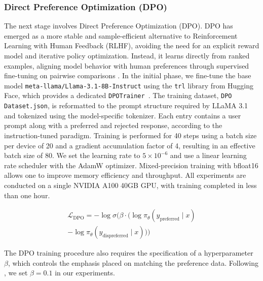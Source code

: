\documentclass[11pt]{article}
\begin{document}
\subsubsection{Direct Preference Optimization (DPO)}
The next stage involves Direct Preference Optimization (DPO). DPO has emerged as a more stable and sample-efficient alternative to Reinforcement Learning with Human Feedback (RLHF), avoiding the need for an explicit reward model and iterative policy optimization. Instead, it learns directly from ranked examples, aligning model behavior with human preferences through supervised fine-tuning on pairwise comparisons \citep{rafailov_direct_2024}. In the initial phase, we fine-tune the base model \texttt{meta-llama/Llama-3.1-8B-Instruct} using the \texttt{trl} library from Hugging Face, which provides a dedicated \texttt{DPOTrainer \citep{vonwerra2022trl}}. The training dataset, \texttt{DPO Dataset.json}, is reformatted to the prompt structure required by LLaMA 3.1 and tokenized using the model-specific tokenizer. Each entry contains a user prompt along with a preferred and rejected response, according to the instruction-tuned paradigm. Training is performed for 40 steps using a batch size per device of 20 and a gradient accumulation factor of 4, resulting in an effective batch size of 80. We set the learning rate to $5 \times 10^{-6}$ and use a linear learning rate scheduler with the AdamW optimizer. Mixed-precision training with bfloat16 allows one to improve memory efficiency and throughput. All experiments are conducted on a single NVIDIA A100 40GB GPU, with training completed in less than one hour.

\begin{multline}
\mathcal{L}_{\text{DPO}} = - \log \sigma \Big( \beta \cdot \big( \log \pi_{\theta}(y_{\text{preferred}} \mid x) \\
- \log \pi_{\theta}(y_{\text{dispreferred}} \mid x) \big) \Big)
\end{multline}

The DPO training procedure also requires the specification of a hyperparameter $\beta$, which controls the emphasis placed on matching the preference data. Following \citet{rafailov_direct_2024}, we set $\beta = 0.1$ in our experiments.
\end{document}
